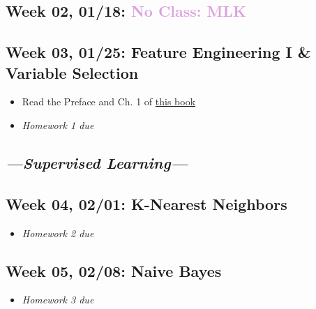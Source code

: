 \documentclass[11pt,]{article}
\providecommand{\tightlist}{%
  \setlength{\itemsep}{0pt}\setlength{\parskip}{0pt}}
\begin{document}
\hypertarget{week-02-0118}{%
\subsection{\texorpdfstring{Week 02, 01/18:
\textcolor{Plum}{No Class: MLK}}{Week 02, 01/18: }}\label{week-02-0118}}

\hypertarget{week-03-0125-feature-engineering-i-variable-selection}{%
\subsection{Week 03, 01/25: Feature Engineering I \& Variable
Selection}\label{week-03-0125-feature-engineering-i-variable-selection}}

\begin{itemize}
\tightlist
\item
  Read the Preface and Ch. 1 of \href{http://www.feat.engineering/}{this
  book}
\item
  \emph{\textcolor{Bittersweet}{Homework 1 due}}
\end{itemize}

\hypertarget{section}{%
\subsection{\texorpdfstring{\emph{\textcolor{OliveGreen}{---Supervised Learning---}}}{}}\label{section}}

\hypertarget{week-04-0201-k-nearest-neighbors}{%
\subsection{Week 04, 02/01: K-Nearest
Neighbors}\label{week-04-0201-k-nearest-neighbors}}

\begin{itemize}
\tightlist
\item
  \emph{\textcolor{Bittersweet}{Homework 2 due}}
\end{itemize}

\hypertarget{week-05-0208-naive-bayes}{%
\subsection{Week 05, 02/08: Naive
Bayes}\label{week-05-0208-naive-bayes}}

\begin{itemize}
\tightlist
\item
  \emph{\textcolor{Bittersweet}{Homework 3 due}}
\end{itemize}
\end{document}
